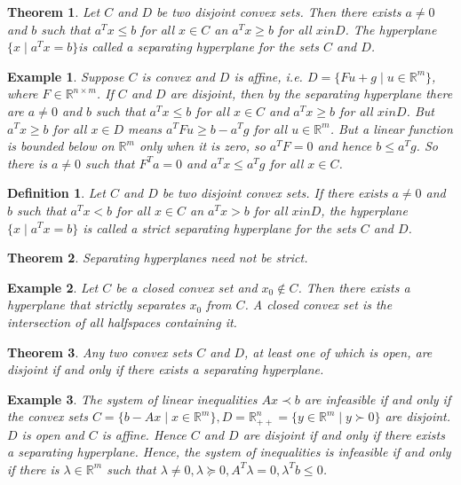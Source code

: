 \documentclass[a4paper]{article}
\newtheorem{mytheorem}{Theorem}
\newtheorem{example}{Example}
\newtheorem{mydef}{Definition}
\numberwithin{mytheorem}{section}
\numberwithin{mydef}{section}
\numberwithin{example}{section}
\begin{document}
\begin{mytheorem} Let $C$ and $D$ be two disjoint convex sets. Then there exists $a \neq 0$ and $b$ such that $a^{T}x \leq b$ for all $x \in C$ an $a^{T}x \geq b$ for all $x in D$. The hyperplane $\{ x \mid a^{T}x = b \}$is called a separating hyperplane for the sets $C$ and $D$. \end{mytheorem}

\begin{example} Suppose $C$ is convex and $D$ is affine, i.e. $D = \{ Fu + g \mid u \in \mathbb{R}^{m}\}$, where $F \in \mathbb{R}^{n \times m}$. If $C$ and $D$ are disjoint, then by the separating hyperplane there are $a \neq 0$ and $b$ such that $a^{T}x \leq b$ for all $x \in C$ and $a^{T}x \geq b$ for all $x in D$. But $a^{T}x \geq b$ for all $x \in D$ means $a^{T}Fu \geq b - a^{T}g$ for all $u \in \mathbb{R}^{m}$. But a linear function is bounded below on $\mathbb{R}^{m}$ only when it is zero, so $a^{T}F = 0$ and hence $b \leq a^{T}g$. So there is $a \neq 0$ such that $F^{T}a = 0$ and $a^{T}x \leq a^{T}g$ for all $x \in C$.
\end{example}

\begin{mydef} Let $C$ and $D$ be two disjoint convex sets. If there exists $a \neq 0$ and $b$ such that $a^{T}x < b$ for all $x \in C$ an $a^{T}x > b$ for all $x in D$, the hyperplane $\{ x \mid a^{T}x = b \}$ is called a strict separating hyperplane for the sets $C$ and $D$. \end{mydef}

\begin{mytheorem} Separating hyperplanes need not be strict. \end{mytheorem}

\begin{example} Let $C$ be a closed convex set and $x_{0} \notin C$. Then there exists a hyperplane that strictly separates $x_{0}$ from $C$. A closed convex set is the intersection of all halfspaces containing it.
\end{example}

\begin{mytheorem} Any two convex sets $C$ and $D$, at least one of which is open, are disjoint if and only if there exists a separating hyperplane.\end{mytheorem}

\begin{example} The system of linear inequalities $Ax \prec b$ are infeasible if and only if the convex sets $C = \{ b - Ax \mid x \in \mathbb{R}^{m}\}, D = \mathbb{R}^{n}_{++} = \{ y \in \mathbb{R}^{m} \mid y \succ 0 \}$ are disjoint. $D$ is open and $C$ is affine. Hence $C$ and $D$ are disjoint if and only if there exists a separating hyperplane. Hence, the system of inequalities is infeasible if and only if there is $\lambda \in \mathbb{R}^{m}$ such that $\lambda \neq 0, \lambda \succeq 0, A^{T} \lambda = 0, \lambda^{T}b \leq 0$.  
\end{example}
\end{document}

